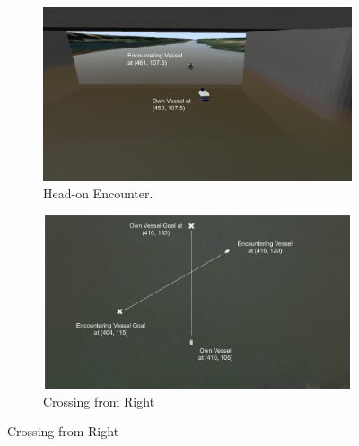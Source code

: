     \begin{figure}[H]
    \centering
    
        \begin{subfigure}[b]{0.495\textwidth}
            \centering
            \includegraphics[width=\textwidth]{figs/Chap5/simulation_uwsim_headon_starting_pos.png}
            \caption{Head-on Encounter.}
            \label{fig:simulation_uwsim_headon_starting_pos}
        \end{subfigure}
        \begin{subfigure}[b]{0.495\textwidth}
            \centering
            \includegraphics[width=\textwidth]{figs/Chap5/simulation_uwsim_crossingright_starting_pos.png}
            \caption{Crossing from Right}
            \label{fig:simulation_uwsim_crossingright_starting_pos}
        \end{subfigure}
        

\end{figure}

